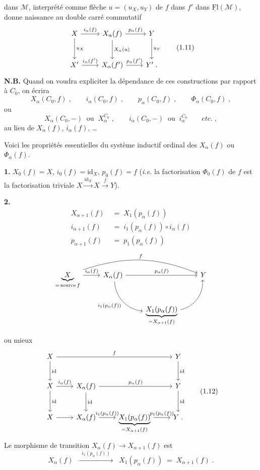 \documentclass[11pt]{article}
\newcommand{\printedpage}[1]{\marginpar{\footnotesize p.~#1}}
\newcommand{\msp}[1]{\marginpar{\footnotesize [#1]}}
\newcommand{\M}{\mathcal{M}}
\newcommand{\uFl}{\underline{\mathrm{Fl}}}
\begin{document}
dans $\M$, interprété comme flèche $u = (u_X, u_Y)$ de $f$ dans $f'$ dans $\uFl(\M)$, donne naissance au double carré commutatif
\[
\begin{tikzcd}[row sep=large]
X \arrow[r, "i_\alpha(f)"] \arrow[d, "u_X"] & X_\alpha(f) \arrow[r, "p_\alpha(f)"] \arrow[d, "X_\alpha(u)"] & Y \arrow[d, "u_Y"] \\
X' \arrow[r, "{i_\alpha(f')}"] & X_\alpha(f') \arrow[r, "{p_\alpha(f')}"] & Y' \;.
\end{tikzcd}
\tag*{(1.11)}
\]
\textbf{N.B.} Quand on voudra expliciter la dépendance de ces constructions par rapport à $C_0$, on écrira
\[
X_\alpha(C_0,f) \;, \qquad i_\alpha(C_0,f) \;, \qquad p_\alpha(C_0,f) \;, \qquad \Phi_\alpha(C_0,f) \;,
\]
ou
\[
X_\alpha(C_0,-) \;\;\text{ou}\;\; X_\alpha^{C_0} \;, \qquad i_\alpha(C_0,-) \;\;\text{ou}\;\; i_\alpha^{C_0} \qquad \textit{etc.} \;,
\]
au lieu de $X_\alpha(f)$, $i_\alpha(f)$, \dots

Voici les propriétés essentielles du système inductif ordinal des $X_\alpha(f)$ ou $\Phi_\alpha(f)$.

\msp{page 3}

\textbf{1.} $X_0(f) = X$, $i_0(f) = \mathrm{id}_X$, $p_0(f) = f$ (\textit{i.e.} la factorisation $\Phi_0(f)$ de $f$ est la factorisation triviale $X \xrightarrow{\mathrm{id}_X} X \xrightarrow{f} Y$).

\textbf{2.}
\[
\begin{aligned}
X_{\alpha+1}(f) &\;=\; X_1(p_\alpha(f)) \\
i_{\alpha+1}(f) &\;=\; i_1(p_\alpha(f)) \circ i_\alpha(f) \\
p_{\alpha+1}(f) &\;=\; p_1(p_\alpha(f))
\end{aligned}
\]
\[
\begin{tikzcd}
\underbrace{X}_{= \,\mathrm{source}\, f} \arrow[r, "i_\alpha(f)"] \arrow[rrr, bend left=20, "f"] & X_\alpha(f) \arrow[rr, "p_\alpha(f)"] \arrow[dr, bend right=40, "i_1(p_\alpha(f))"'] & & Y \\
& & \underbrace{X_1(p_\alpha(f))}_{= X_{\alpha+1}(f)} \arrow[ur, bend right=40] &
\end{tikzcd}
\]

\clearpage

\printedpage{3}

ou mieux
\[
\begin{tikzcd}[row sep=large]
X \arrow[rrr, "f"] \arrow[d, "\mathrm{id}"] & & & Y \arrow[d, "\mathrm{id}"] \\
X \arrow[r, "i_\alpha(f)"] \arrow[d, "\mathrm{id}"] & X_\alpha(f) \arrow[rr, "p_\alpha(f)"] \arrow[d, "\mathrm{id}"] & & Y \arrow[d, "\mathrm{id}"] \\
X \arrow[r] & X_\alpha(f) \arrow[r, "i_1(p_\alpha(f))"] & \underbrace{X_1(p_\alpha(f))}_{= X_{\alpha+1}(f)} \arrow[r, "p_1(p_\alpha(f))"] & Y \;.
\end{tikzcd}
\tag*{(1.12)}
\]
Le morphisme de transition $X_\alpha(f) \longrightarrow X_{\alpha+1}(f)$ est
\[
X_\alpha(f) \;\; \xrightarrow{\;\;i_1(p_\alpha(f))\;\;} \;\; X_1(p_\alpha(f)) \;=\; X_{\alpha+1}(f) \;.
\]
\end{document}
